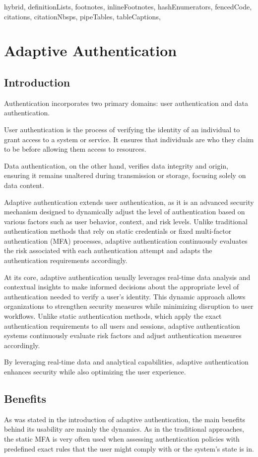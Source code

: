 \documentclass[
  digital,     %
  oneside,     %
  nosansbold,  %
  nocolorbold, %
  lof,         %
  lot,         %
]{fithesis4}
\begin{document}
\shorthandoff{-}
\begin{markdown*}{%
  hybrid,
  definitionLists,
  footnotes,
  inlineFootnotes,
  hashEnumerators,
  fencedCode,
  citations,
  citationNbsps,
  pipeTables,
  tableCaptions,
}
\chapter{Adaptive Authentication}
\section{Introduction}
Authentication incorporates two primary domains: user authentication and data authentication. 

User authentication is the process of verifying the identity of an individual to grant access to a system or service.
It ensures that individuals are who they claim to be before allowing them access to resources.

Data authentication, on the other hand, verifies data integrity and origin, ensuring it remains unaltered during transmission or storage, focusing solely on data content.

Adaptive authentication extends user authentication, as it is an advanced security mechanism designed to dynamically adjust the level of authentication based on various factors such as user behavior, context, and risk levels.
Unlike traditional authentication methods that rely on static credentials or fixed multi-factor authentication (MFA) processes, adaptive authentication continuously evaluates the risk associated with each authentication attempt and adapts the authentication requirements accordingly.

At its core, adaptive authentication usually leverages real-time data analysis and contextual insights to make informed decisions about the appropriate level of authentication needed to verify a user's identity.
This dynamic approach allows organizations to strengthen security measures while minimizing disruption to user workflows.
Unlike static authentication methods, which apply the exact authentication requirements to all users and sessions, adaptive authentication systems continuously evaluate risk factors and adjust authentication measures accordingly.

By leveraging real-time data and analytical capabilities, adaptive authentication enhances security while also optimizing the user experience.\cite{intro-logintc}
\newpage
\section{Benefits}
As was stated in the introduction of adaptive authentication, the main benefits behind its usability are mainly the dynamics.
As in the traditional approaches, the static MFA is very often used when assessing authentication policies with predefined exact rules that the user might comply with or the system's state is in. 


\end{markdown*}
\end{document}

